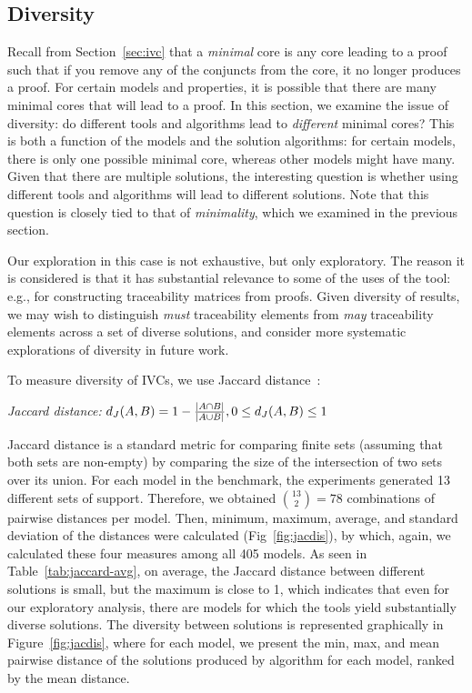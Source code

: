 \subsection{Diversity}
\label{sec:diversity}
Recall from Section~\ref{sec:ivc} that a {\em minimal} core is any core leading to a proof such that if you remove any of the conjuncts from the core, it no longer produces a proof.  For certain models and properties, it is possible that there are many minimal cores that will lead to a proof.  In this section, we examine the issue of diversity: do different tools and algorithms lead to {\em different} minimal cores?  This is both a function of the models and the solution algorithms: for certain models, there is only one possible minimal core, whereas other models might have many. Given that there are multiple solutions, the interesting question is whether using different tools and algorithms will lead to different solutions.  Note that this question is closely tied to that of {\em minimality}, which we examined in the previous section.

Our exploration in this case is not exhaustive, but only exploratory.  The reason it is considered is that it has substantial relevance to some of the uses of the tool: e.g., for constructing traceability matrices from proofs.  Given diversity of results, we may wish to distinguish {\em must} traceability elements from {\em may} traceability elements across a set of diverse solutions, and consider more systematic explorations of diversity in future work.

To measure diversity of IVCs, we use Jaccard distance~:
\begin{definition}{\emph{Jaccard distance:}}
  \label{def:dj}
  $d_J(\small{A}, \small{B}) = 1 - \frac{|A \cap B|}{|A \cup B|} ,\\ 0 \leq d_J(\small{A}, \small{B}) \leq 1$
\end{definition}
\noindent Jaccard distance is a standard metric for comparing finite sets (assuming that both sets are non-empty) by comparing the size of the intersection of two sets over its union.  For each model in the benchmark, the experiments generated 13 different sets of support. Therefore, we obtained $\binom{13}{2} = 78$ combinations of pairwise distances per model. Then, minimum, maximum, average, and standard deviation of the distances were calculated (Fig~\ref{fig:jacdis}), by which, again, we calculated these four measures among all 405 models.  As seen in Table~\ref{tab:jaccard-avg}, on average, the Jaccard distance between different solutions is small, but the maximum is close to 1, which indicates that even for our exploratory analysis, there are models for which the tools yield substantially diverse solutions.  The diversity between solutions is represented graphically in Figure~\ref{fig:jacdis}, where for each model, we present the min, max, and mean pairwise distance of the solutions produced by algorithm \ucalg for each model, ranked by the mean distance.

